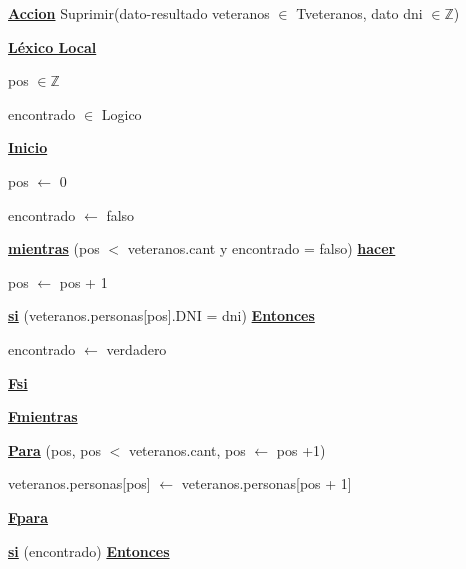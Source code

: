 \documentclass{article}
\begin{document}
    \vspace{4mm}

    \hspace{4mm}\underline{\textbf{Accion}} Suprimir(dato-resultado veteranos $\in$ Tveteranos, dato dni $\in \mathbb{Z}$)

        \hspace{8mm}\underline{\textbf{Léxico Local}}

            \hspace{12mm}pos $\in \mathbb{Z}$

            \hspace{12mm}encontrado $\in$ Logico

        \hspace{8mm}\underline{\textbf{Inicio}}

            \hspace{12mm} pos $\leftarrow$ 0

            \hspace{12mm} encontrado $\leftarrow$ falso

            \hspace{12mm}\underline{\textbf{mientras}} (pos $<$ veteranos.cant y encontrado = falso) \underline{\textbf{hacer}}

                \hspace{16mm}pos $\leftarrow$ pos + 1

                \hspace{16mm}\underline{\textbf{si}} (veteranos.personas[pos].DNI = dni) \underline{\textbf{Entonces}}

                    \hspace{20mm}encontrado $\leftarrow$ verdadero

                \hspace{16mm}\underline{\textbf{Fsi}}

            \hspace{12mm}\underline{\textbf{Fmientras}}

            \hspace{12mm}\underline{\textbf{Para}} (pos, pos $<$ veteranos.cant, pos $\leftarrow$ pos +1)

                \hspace{16mm}veteranos.personas[pos] $\leftarrow$ veteranos.personas[pos + 1]

            \hspace{12mm}\underline{\textbf{Fpara}}

            \hspace{12mm}\underline{\textbf{si}} (encontrado) \underline{\textbf{Entonces}}
\end{document}
